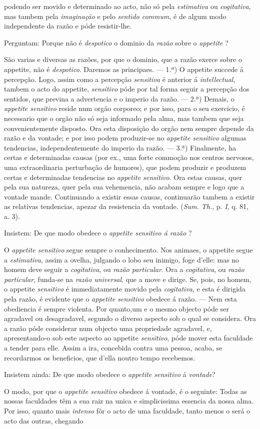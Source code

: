 podendo ser movido e determinado ao acto, não só pela \emph{estimativa} ou \emph{cogitativa}, mas tambem pela \emph{imaginação} e pelo \emph{sentido commum}, é de algum modo independente da razão e póde resistir-lhe.\par Perguntam: Porque não é \emph{despotico} o dominio da \emph{razão} sobre o \emph{appetite} ?\par São varias e diversas as razões, por que o dominio, que a razão exerce sobre o appetite, não é \emph{despotico}. Daremos as principaes. --- 1.ª) O appetite succede á percepção. Logo, assim como a percepção \emph{sensitiva} é anterior á \emph{intellectual}, tambem o acto do appetite, \emph{sensitivo} póde por tal forma seguir a percepção dos sentidos, que previna a advertencia e o imperio da razão. --- 2.ª) Demais, o \emph{appetite sensitivo} reside num orgão corporeo; e por isso, para o seu exercicio, é necessario que o orgão não só seja informado pela alma, mas tambem que seja convenientemente disposto. Ora esta disposição do orgão nem sempre depende da razão e da vontade; e por isso podem produzir-se no \emph{appetite sensitivo} algumas tendencias, independentemente do imperio da razão. --- 3.ª) Finalmente, ha certas e determinadas causas (por ex., uma forte commoção nos centros nervosos, uma extraordinaria perturbação de humores), que podem produzir e produzem certas e determinadas tendencias no \emph{appetite sensitivo}. Ora estas causas, quer pela sua natureza, quer pela sua vehemencia, não acabam sempre e logo que a vontade mande. Continuando a existir essas causas, continuarão tambem a existir as relativas tendencias, apezar da resistencia da vontade. (\emph{Sum. Th.}, p. \emph{I}, q. 81, a. 3).\par Insistem: De que modo obedece o \emph{appetite sensitivo á razão} ?\par O \emph{appetite sensitivo} segue sempre o conhecimento. Nos animaes, o appetite segue a \emph{estimativa}, assim a ovelha, julgando o lobo seu inimigo, foge d'elle: mas no homem deve seguir a \emph{cogitativa}, ou \emph{razão particular}. Ora a \emph{cogitativa}, ou \emph{razão particular}, funda-se na \emph{razão universal}, que a move e dirige. Se, pois, no homem, o appetite \emph{sensitivo} é immediatamente movido pela \emph{cogitativa}, e esta é dirigida pela razão, é evidente que o \emph{appetite sensitivo} obedece á razão. --- Nem esta obediencia é sempre violenta. Por quanto,um e o mesmo objecto póde ser agradavel ou desagradavel, segundo o diverso aspecto sob o qual se considera. Ora a razão póde considerar num objecto uma propriedade agradavel, e, apresentando-o sob este aspecto ao appetite \emph{sensitivo}, póde mover esta faculdade a tender para elle. Assim a ira, concebida contra uma pessoa, acaba, se recordarmos os beneficios, que d'ella noutro tempo recebemos.\par Insistem ainda: De que modo obedece o \emph{appetite sensitivo} á \emph{vontade}?\par O modo, por que o \emph{appetite sensitivo} obedece á vontade, é o seguinte: Todas as nossas faculdades têm a sua raiz na unica e simplicissima essencia da nossa alma. Por isso, quanto mais \emph{intenso} fôr o acto de uma faculdade, tanto menos o será o acto das outras, chegando 